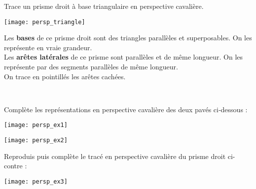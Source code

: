 \begin{methode*1}
 \begin{exemple*1}
Trace un prisme droit à base triangulaire en perspective cavalière. \\[1em]
 \begin{minipage}[c]{0.30\linewidth}
\texttt{[image: persp\_triangle]} 
  \end{minipage} \hfill%
  \begin{minipage}[c]{0.76\linewidth} 
Les \textcolor{H1}{\textbf{bases}} de ce prisme droit sont des triangles parallèles et superposables. On les représente en vraie grandeur. \\[0.5em]
Les \textcolor{C1}{\textbf{arêtes latérales}} de ce prisme sont parallèles et de même longueur. On les représente par des segments parallèles de même longueur. \\[0.5em]
On trace en pointillés les arêtes cachées. 
   \end{minipage} \\
 \end{exemple*1}

 \exercice  
Complète les représentations en perspective cavalière des deux pavés ci‑dessous :
\begin{colenumerate}{2}
 \item 
 
 \texttt{[image: persp\_ex1]} 
 \item 
 
 \texttt{[image: persp\_ex2]} 
 \end{colenumerate}

 \exercice
 
 \begin{minipage}[c]{0.48\linewidth}
Reproduis puis complète le tracé en perspective cavalière du prisme droit ci-contre :
  \end{minipage} \hfill%
  \begin{minipage}[c]{0.48\linewidth} 
\begin{center} \texttt{[image: persp\_ex3]} \end{center}
  \end{minipage} \\

 \end{methode*1}
 

